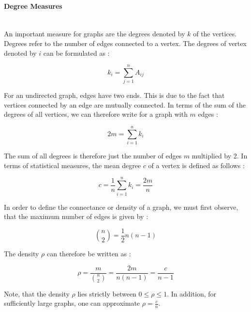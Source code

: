 	\paragraph{Degree Measures} \mbox{}\\

	\noindent An important measure for graphs are the degrees denoted by $k$ of 
	the vertices. Degrees refer to the number of edges connected to a vertex. The 
	degrees of vertex denoted by $i$ can be formulated as \citep[p. 133]{Newman2010}:

	\begin{equation}
		k_i = \sum_{j=1}^{n} A_{ij}
	\end{equation}

	\noindent For an undirected graph, edges have two ends. This is due to the 
	fact that vertices connected by an edge are mutually connected. In terms of 
	the sum of the degrees of all vertices, we can therefore write for a graph 
	with $m$ edges \citep[p. 133]{Newman2010}:

	\begin{equation}
		2m = \sum_{i=1}^{n} k_i	
	\end{equation}

	\noindent The sum of all degrees is therefore just the number of edges $m$ 
	multiplied by 2. In terms of statistical measures, the mean degree $c$ of a 
	vertex is defined as follows \citep[p. 134]{Newman2010}:

	\begin{equation}
		c = \frac{1}{n}\sum_{i=1}^{n}k_i = \frac{2m}{n}
	\end{equation}

	\noindent In order to define the connectance or density of a graph, we must
	first observe, that the maximum number of edges is given by \citep[p. 134]{Newman2010}:

	\begin{equation}
		{n \choose 2} = \frac{1}{2}n(n-1)
	\end{equation}

	\noindent The density $\rho$ can therefore be written as \citep[p. 134]{Newman2010}:

	\begin{equation}
		\rho = \frac{m}{{n \choose 2}} = \frac{2m}{n(n-1)} = \frac{c}{n-1}
	\end{equation}

	\noindent Note, that the density $\rho$ lies strictly between 
	$0 \leqslant \rho \leqslant 1$. In addition, for sufficiently large graphs,
	one can approximate $\rho = \frac{c}{n}$. 

